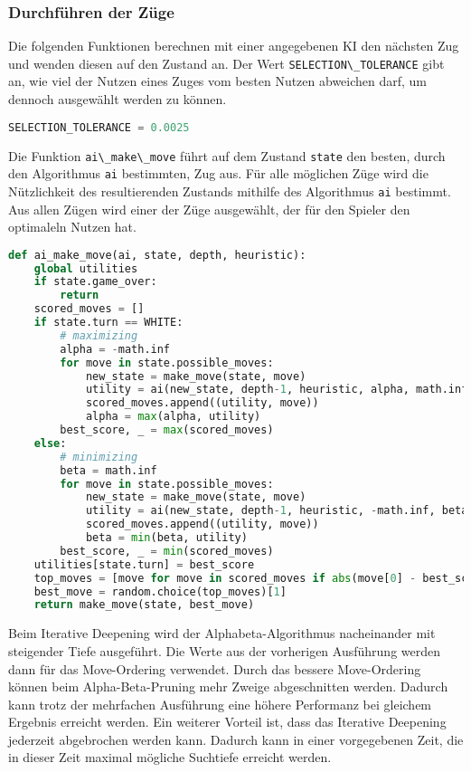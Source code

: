 \hypertarget{durchfuxfchren-der-zuxfcge}{%
\subsubsection{Durchführen der Züge}\label{durchfuxfchren-der-zuxfcge}}

Die folgenden Funktionen berechnen mit einer angegebenen KI den nächsten
Zug und wenden diesen auf den Zustand an. Der Wert
\passthrough{\lstinline!SELECTION\_TOLERANCE!} gibt an, wie viel der
Nutzen eines Zuges vom besten Nutzen abweichen darf, um dennoch
ausgewählt werden zu können.

\begin{lstlisting}[language=Python]
SELECTION_TOLERANCE = 0.0025
\end{lstlisting}

Die Funktion \passthrough{\lstinline!ai\_make\_move!} führt auf dem
Zustand \passthrough{\lstinline!state!} den besten, durch den
Algorithmus \passthrough{\lstinline!ai!} bestimmten, Zug aus. Für alle
möglichen Züge wird die Nützlichkeit des resultierenden Zustands
mithilfe des Algorithmus \passthrough{\lstinline!ai!} bestimmt. Aus
allen Zügen wird einer der Züge ausgewählt, der für den Spieler den
optimaleln Nutzen hat.

\begin{lstlisting}[language=Python]
def ai_make_move(ai, state, depth, heuristic):
    global utilities
    if state.game_over:
        return
    scored_moves = []
    if state.turn == WHITE:
        # maximizing
        alpha = -math.inf
        for move in state.possible_moves:
            new_state = make_move(state, move)
            utility = ai(new_state, depth-1, heuristic, alpha, math.inf)
            scored_moves.append((utility, move))
            alpha = max(alpha, utility)
        best_score, _ = max(scored_moves)
    else:
        # minimizing
        beta = math.inf
        for move in state.possible_moves:
            new_state = make_move(state, move)
            utility = ai(new_state, depth-1, heuristic, -math.inf, beta)
            scored_moves.append((utility, move))
            beta = min(beta, utility)
        best_score, _ = min(scored_moves)
    utilities[state.turn] = best_score
    top_moves = [move for move in scored_moves if abs(move[0] - best_score) <= SELECTION_TOLERANCE]
    best_move = random.choice(top_moves)[1]
    return make_move(state, best_move)
\end{lstlisting}

Beim Iterative Deepening wird der Alphabeta-Algorithmus nacheinander mit
steigender Tiefe ausgeführt. Die Werte aus der vorherigen Ausführung
werden dann für das Move-Ordering verwendet. Durch das bessere
Move-Ordering können beim Alpha-Beta-Pruning mehr Zweige abgeschnitten
werden. Dadurch kann trotz der mehrfachen Ausführung eine höhere
Performanz bei gleichem Ergebnis erreicht werden. Ein weiterer Vorteil
ist, dass das Iterative Deepening jederzeit abgebrochen werden kann.
Dadurch kann in einer vorgegebenen Zeit, die in dieser Zeit maximal
mögliche Suchtiefe erreicht werden.


